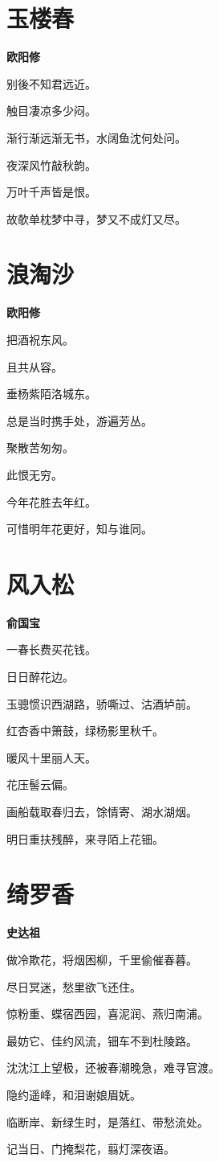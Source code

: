 \documentclass[12pt,a4paper]{ctexbook}
\begin{document}
\section{玉楼春}
\textbf{欧阳修}\par\vspace{0.5em}
别後不知君远近。\par
触目凄凉多少闷。\par
渐行渐远渐无书，水阔鱼沈何处问。\par
夜深风竹敲秋韵。\par
万叶千声皆是恨。\par
故欹单枕梦中寻，梦又不成灯又尽。\par

\section{浪淘沙}
\textbf{欧阳修}\par\vspace{0.5em}
把酒祝东风。\par
且共从容。\par
垂杨紫陌洛城东。\par
总是当时携手处，游遍芳丛。\par
聚散苦匆匆。\par
此恨无穷。\par
今年花胜去年红。\par
可惜明年花更好，知与谁同。\par

\section{风入松}
\textbf{俞国宝}\par\vspace{0.5em}
一春长费买花钱。\par
日日醉花边。\par
玉骢惯识西湖路，骄嘶过、沽酒垆前。\par
红杏香中箫鼓，绿杨影里秋千。\par
暖风十里丽人天。\par
花压髻云偏。\par
画船载取春归去，馀情寄、湖水湖烟。\par
明日重扶残醉，来寻陌上花钿。\par

\section{绮罗香}
\textbf{史达祖}\par\vspace{0.5em}
做冷欺花，将烟困柳，千里偷催春暮。\par
尽日冥迷，愁里欲飞还住。\par
惊粉重、蝶宿西园，喜泥润、燕归南浦。\par
最妨它、佳约风流，钿车不到杜陵路。\par
沈沈江上望极，还被春潮晚急，难寻官渡。\par
隐约遥峰，和泪谢娘眉妩。\par
临断岸、新绿生时，是落红、带愁流处。\par
记当日、门掩梨花，翦灯深夜语。\par
\end{document}
